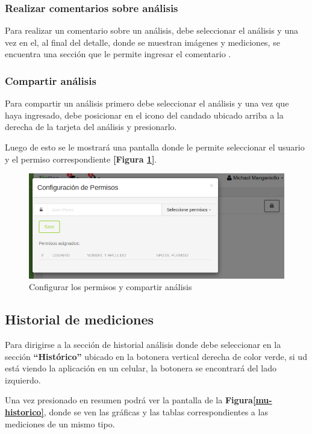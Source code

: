 \documentclass[a4paper,12pt]{article}
\begin{document}
 \subsubsection{Realizar comentarios sobre análisis}
 Para realizar un comentario sobre un análisis, debe seleccionar el análisis y una vez en el, al final del detalle, donde se muestran imágenes y mediciones, se encuentra una sección que le permite ingresar el comentario .

\subsubsection{Compartir análisis}
Para compartir un análisis primero debe seleccionar el análisis y una vez que haya ingresado, debe posicionar en el icono del candado ubicado arriba a la derecha de la tarjeta del análisis y presionarlo. 

Luego de esto  se le mostrará una pantalla donde le permite seleccionar el usuario y el permiso correspondiente \textbf{[Figura \ref{mu-configurar_permiso}]}.

\begin{figure}
	\centering
	\includegraphics[width=.8\textwidth]{img/manual_de_usuario/configurar_permiso}
	\caption{Configurar los permisos y compartir análisis}
	\label{mu-configurar_permiso}
\end{figure}



\subsection{Historial de mediciones}
Para dirigirse a la sección de historial análisis donde debe seleccionar en la sección \textbf{``Histórico''} ubicado en la botonera vertical derecha de color verde, si ud está viendo la aplicación en un celular, la botonera se encontrará del lado izquierdo.

Una vez presionado en resumen podrá ver la pantalla de la \textbf{Figura\ref{mu-historico}}, donde se ven las gráficas y las tablas correspondientes a las mediciones de un mismo tipo.
\end{document}
